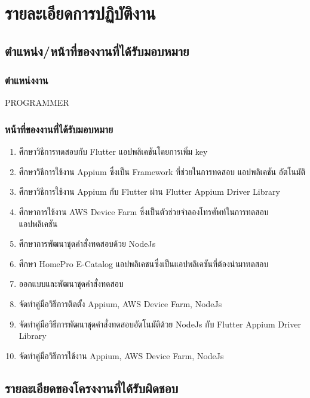 \chapter{รายละเอียดการปฏิบัติงาน}
\thispagestyle{empty}
\label{chapter:coop-detail}

\section{ตำแหน่ง/หน้าที่ของงานที่ได้รับมอบหมาย}

    \subsection{ตำแหน่งงาน}
        PROGRAMMER
    
    \subsection{หน้าที่ของงานที่ได้รับมอบหมาย}
        \begin{enumerate}
            \item ศึกษาวิธีการทดสอบกับ Flutter แอปพลิเคชันโดยการเพิ่ม key
            \item ศึกษาวิธีการใช้งาน Appium ซึ่งเป็น Framework ที่ช่วยในการทดสอบ แอปพลิเคชัน อัตโนมัติ
            \item ศึกษาวิธีการใช้งาน Appium กับ Flutter ผ่าน Flutter Appium Driver Library
            \item ศึกษาการใช้งาน AWS Device Farm ซึ่งเป็นตัวช่วยจำลองโทรศัพท์ในการทดสอบแอปพลิเคชัน
            \item ศึกษาการพัฒนาชุดคำสั่งทดสอบด้วย NodeJs
            \item ศึกษา HomePro E-Catalog แอปพลิเคชนซึ่งเป็นแอปพลิเคชันที่ต้องนำมาทดสอบ
            \item ออกแบบและพัฒนาชุดคำสั่งทดสอบ
            \item จัดทำคู่มือวิธีการติดตั้ง Appium, AWS Device Farm, NodeJs
            \item จัดทำคู่มือวิธีการพัฒนาชุดคำสั่งทดสอบอัตโนมัติด้วย NodeJs กับ Flutter Appium Driver Library
            \item จัดทำคู่มือวิธีการใช้งาน Appium, AWS Device Farm, NodeJs
        \end{enumerate}

\section{รายละเอียดของโครงงานที่ได้รับผิดชอบ}

